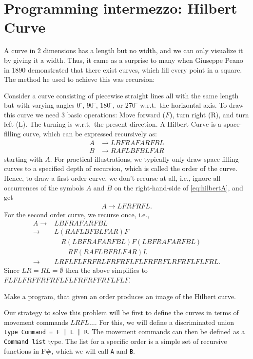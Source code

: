 \section{Programming intermezzo: Hilbert Curve}
A curve in 2 dimensions has a length but no width, and we can only visualize it by giving it a width. Thus, it came as a surprise to many when Giuseppe Peano in 1890 demonstrated that there exist curves, which fill every point in a square. The method he used to achieve this was recursion:
\begin{problem}
  Consider a curve consisting of piecewise straight lines all with the same length but with varying angles $0^{\circ}$, $90^{\circ}$, $180^{\circ}$, or $270^{\circ}$ w.r.t.\ the horizontal axis. To draw this curve we need 3 basic operations: Move forward ($F$), turn right (R), and turn left (L). The turning is w.r.t.\ the present direction. A Hilbert Curve is a space-filling curve, which can be expressed recursively as:
\begin{align}
  A &\rightarrow LBFRAFARFBL\label{eq:hilbertA}\\
  B &\rightarrow RAFLBFBLFAR\label{eq:hilbertB}
\end{align}
starting with $A$. For practical illustrations, we typically only draw space-filling curves to a specified depth of recursion, which is called the order of the curve. Hence, to draw a first order curve, we don't recurse at all, i.e., ignore all occurrences of the symbols $A$ and $B$ on the right-hand-side of \eqref{eq:hilbertA}, and get 
\begin{align*}
  A \rightarrow LFRFRFL. 
\end{align*}
For the second order curve, we recurse once, i.e., 
\begin{align*}
  A 
  \rightarrow &LBFRAFARFBL \\
  \rightarrow &L(RAFLBFBLFAR)F\\
              &\quad R(LBFRAFARFBL)F(LBFRAFARFBL)\\
              &\qquad RF(RAFLBFBLFAR)L\\
  \rightarrow &LRFLFLFRFRLFRFRFLFLFRFRFLRFRFLFLFRL.
\end{align*}
Since $LR = RL = \emptyset$ then the above simplifies to $FLFLFRFFRFRFLFLFRFRFFRFLFLF$.

Make a program, that given an order produces an image of the Hilbert curve.
\end{problem}
Our strategy to solve this problem will be first to define the curves in terms of movement commands $LRFL\ldots$. For this, we will define a discriminated union
\lstinline{type Command = F | L | R}. The movement commands can then be defined as a \lstinline{Command list} type. The list for a specific order is a simple set of recursive functions in F\#, which we will call \lstinline{A} and \lstinline{B}.

